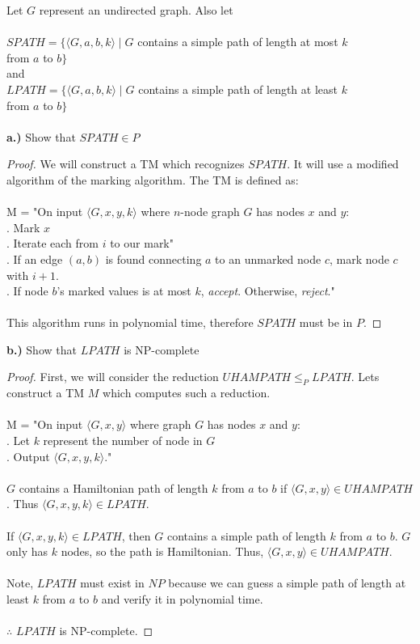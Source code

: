 \documentclass[11pt]{article}
\begin{document}
Let $G$ represent an undirected graph. Also let \\\\
\indent $SPATH = \{ \langle G, a, b, k \rangle \mid G $ contains a simple path of length at most $k$ \\ \indent \indent \indent \indent \indent \indent \indent \indent \indent from $a$ to $b \}$ \\
and \\ 
\indent $LPATH = \{ \langle G, a, b, k \rangle \mid G $ contains a simple path of length at least $k$ \\ \indent \indent \indent \indent \indent \indent \indent \indent \indent from $a$ to $b \}$ \\\\
\textbf{a.)} Show that $SPATH \in P$
\begin{proof}
We will construct a TM which recognizes $SPATH$. It will use a modified algorithm of the marking algorithm. The TM is defined as:\\\\
M = "On input $\langle G, x, y, k \rangle$ where $n$-node graph $G$ has nodes $x$ and $y$:\\
. Mark $x$\\
. Iterate each from $i$ to our mark"\\
. \indent If an edge $(a,b)$ is found connecting $a$ to an unmarked node $c$, mark node $c$ with $i + 1$.\\
. If node $b$'s marked values is at most $k$, \textit{accept}. Otherwise, \textit{reject}."\\\\
This algorithm runs in polynomial time, therefore $SPATH$ must be in $P$.
\end{proof}
\noindent
\textbf{b.)} Show that $LPATH$ is NP-complete
\begin{proof}
First, we will consider the reduction $UHAMPATH \leq_{P} LPATH$. Lets construct a TM $M$ which computes such a reduction. \\\\
M = "On input $\langle G, x , y \rangle$ where graph $G$ has nodes $x$ and $y$:\\
. Let $k$ represent the number of node in $G$\\
. Output $\langle G, x , y , k \rangle$." \\\\
$G$ contains a Hamiltonian path of length $k$ from $a$ to $b$ if $\langle G, x , y \rangle \in UHAMPATH$.
Thus $\langle G, x , y, k \rangle \in LPATH$.\\\\
If $\langle G, x , y, k \rangle \in LPATH$, then $G$ contains a simple path of length $k$ from $a$ to $b$. $G$ only has $k$ nodes, so the path is Hamiltonian. Thus, $\langle G, x , y \rangle \in UHAMPATH$.\\\\
Note, $LPATH$ must exist in $NP$ because we can guess a simple path of length at least $k$ from $a$ to $b$ and verify it in polynomial time.\\\\
$\therefore$ $LPATH$ is NP-complete.
\end{proof}
\newpage
\end{document}
